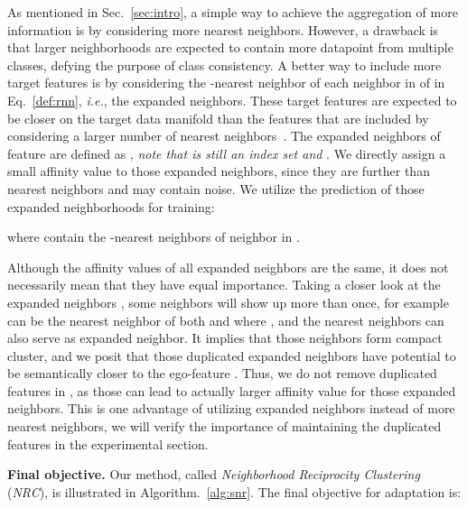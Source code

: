 \documentclass{article}
\begin{document}
As mentioned in Sec.~\ref{sec:intro}, a simple way to achieve the aggregation of more information is by considering more nearest neighbors. However, a drawback is that larger neighborhoods are expected to contain more datapoint from multiple classes, defying the purpose of class consistency. A better way to include more target features is by considering the -nearest neighbor of each neighbor in  of  in Eq.~\ref{def:rnn}, \textit{i.e.}, the expanded neighbors. These target features are expected to be closer on the target data manifold than the features that are included by considering a larger number of nearest neighbors~\cite{tenenbaum2000global}.
The expanded neighbors of feature  are defined as , \textit{note that  is still an index set and }. 
We directly assign a small affinity value  to those expanded neighbors, since they are further than nearest neighbors and may contain noise.
We utilize the prediction of those expanded neighborhoods for training:

where  contain the -nearest neighbors of neighbor  in . 

Although the affinity values of all expanded neighbors are the same, it does not necessarily mean that they have equal importance. Taking a closer look at the expanded neighbors , some neighbors will show up more than once, for example  can be the nearest neighbor of both  and  where , and the nearest neighbors can also serve as expanded neighbor. It implies that those neighbors form compact cluster, and we posit that those duplicated expanded neighbors have potential to be semantically closer to the ego-feature . Thus, we do not remove duplicated features in , as those can lead to actually larger affinity value for those expanded neighbors. This is one advantage of utilizing expanded neighbors instead of more nearest neighbors, we will verify the importance of maintaining  the duplicated features in the experimental section.







\noindent \textbf{Final objective.}
Our method, called \emph{Neighborhood Reciprocity Clustering} (\emph{NRC}),  is illustrated in Algorithm.~\ref{alg:snr}. The final objective for adaptation is:
\end{document}
